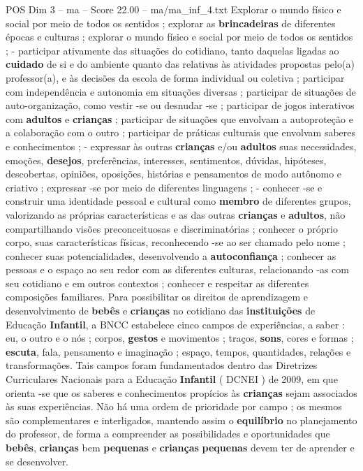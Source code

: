 \begin{textsample}{POS Dim 3 – ma – Score 22.00 – ma/ma\_inf\_4.txt}
Explorar o mundo físico e social por meio de todos os sentidos ; explorar as \textbf{brincadeiras} de diferentes épocas e culturas ; explorar o mundo físico e social por meio de todos os sentidos ; - participar ativamente das situações do cotidiano, tanto daquelas ligadas ao \textbf{cuidado} de si e do ambiente quanto das relativas às atividades propostas pelo(a) professor(a), e às decisões da escola de forma individual ou coletiva ; participar com independência e autonomia em situações diversas ; participar de situações de auto-organização, como vestir -se ou desnudar -se ; participar de jogos interativos com \textbf{adultos} e \textbf{crianças} ; participar de situações que envolvam a autoproteção e a colaboração com o outro ; participar de práticas culturais que envolvam saberes e conhecimentos ; - expressar às outras \textbf{crianças} e/ou \textbf{adultos} suas necessidades, emoções, \textbf{desejos}, preferências, interesses, sentimentos, dúvidas, hipóteses, descobertas, opiniões, oposições, histórias e pensamentos de modo autônomo e criativo ; expressar -se por meio de diferentes linguagens ; - conhecer -se e construir uma identidade pessoal e cultural como \textbf{membro} de diferentes grupos, valorizando as próprias características e as das outras \textbf{crianças} e \textbf{adultos}, não compartilhando visões preconceituosas e discriminatórias ; conhecer o próprio corpo, suas características físicas, reconhecendo -se ao ser chamado pelo nome ; conhecer suas potencialidades, desenvolvendo a \textbf{autoconfiança} ; conhecer as pessoas e o espaço ao seu redor com as diferentes culturas, relacionando -as com seu cotidiano e em outros contextos ; conhecer e respeitar as diferentes composições familiares.
Para possibilitar os direitos de aprendizagem e desenvolvimento de \textbf{bebês} e \textbf{crianças} no cotidiano das \textbf{instituições} de Educação \textbf{Infantil}, a BNCC estabelece cinco campos de experiências, a saber : eu, o outro e o nós ; corpos, \textbf{gestos} e movimentos ; traços, \textbf{sons}, cores e formas ; \textbf{escuta}, fala, pensamento e imaginação ; espaço, tempos, quantidades, relações e transformações.
Tais campos foram fundamentados dentro das Diretrizes Curriculares Nacionais para a Educação \textbf{Infantil} ( DCNEI ) de 2009, em que orienta -se que os saberes e conhecimentos propícios às \textbf{crianças} sejam associados às suas experiências.
Não há uma ordem de prioridade por campo ; os mesmos são complementares e interligados, mantendo assim o \textbf{equilíbrio} no planejamento do professor, de forma a compreender as possibilidades e oportunidades que \textbf{bebês}, \textbf{crianças} bem \textbf{pequenas} e \textbf{crianças} \textbf{pequenas} devem ter de aprender e se desenvolver.

\end{textsample}
